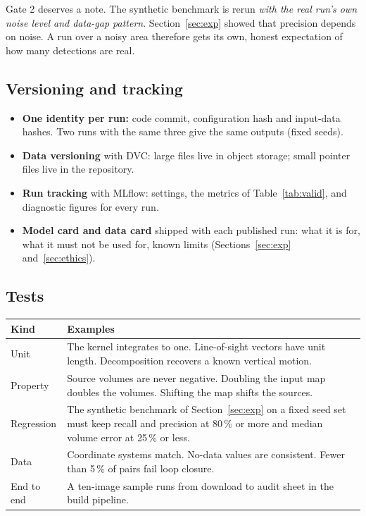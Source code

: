 Gate 2 deserves a note. The synthetic benchmark is rerun \emph{with the real run's own noise level
and data-gap pattern}. Section~\ref{sec:exp} showed that precision depends on noise. A run over a
noisy area therefore gets its own, honest expectation of how many detections are real.

\subsection{Versioning and tracking}

\begin{itemize}
\item \textbf{One identity per run:} code commit, configuration hash and input-data hashes. Two runs
with the same three give the same outputs (fixed seeds).
\item \textbf{Data versioning} with DVC: large files live in object storage; small pointer files live
in the repository.
\item \textbf{Run tracking} with MLflow: settings, the metrics of Table~\ref{tab:valid}, and
diagnostic figures for every run.
\item \textbf{Model card and data card} shipped with each published run: what it is for, what it must
not be used for, known limits (Sections~\ref{sec:exp} and~\ref{sec:ethics}).
\end{itemize}

\subsection{Tests}

{\small
\begin{xltabular}{\linewidth}{@{}L{30mm}Y@{}}
\toprule
\textbf{Kind} & \textbf{Examples}\\*
\midrule
Unit & The kernel integrates to one. Line-of-sight vectors have unit length. Decomposition recovers a
  known vertical motion.\\
Property & Source volumes are never negative. Doubling the input map doubles the volumes. Shifting the
  map shifts the sources.\\
Regression & The synthetic benchmark of Section~\ref{sec:exp} on a fixed seed set must keep recall and
  precision at 80\,\% or more and median volume error at 25\,\% or less.\\
Data & Coordinate systems match. No-data values are consistent. Fewer than 5\,\% of pairs fail loop
  closure.\\
End to end & A ten-image sample runs from download to audit sheet in the build pipeline.\\
\bottomrule
\end{xltabular}}

